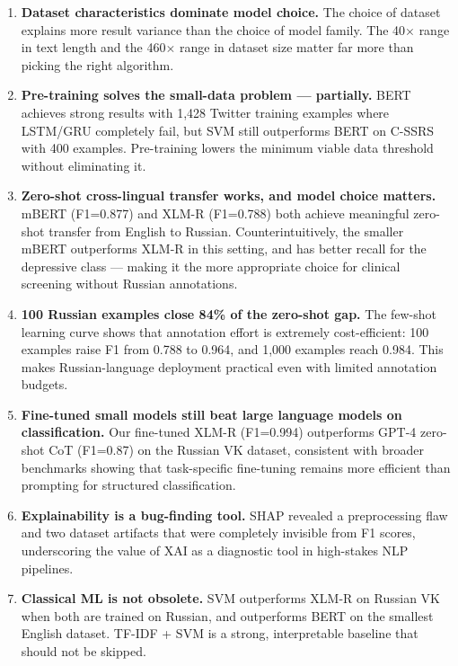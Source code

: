 \documentclass[12pt, a4paper, oneside]{report}
\begin{document}
\begin{enumerate}
    \item \textbf{Dataset characteristics dominate model choice.} The choice of dataset explains more result variance than the choice of model family. The 40$\times$ range in text length and the 460$\times$ range in dataset size matter far more than picking the right algorithm.

    \item \textbf{Pre-training solves the small-data problem — partially.} BERT achieves strong results with 1,428 Twitter training examples where LSTM/GRU completely fail, but SVM still outperforms BERT on C-SSRS with 400 examples. Pre-training lowers the minimum viable data threshold without eliminating it.

    \item \textbf{Zero-shot cross-lingual transfer works, and model choice matters.} mBERT (F1=0.877) and XLM-R (F1=0.788) both achieve meaningful zero-shot transfer from English to Russian. Counterintuitively, the smaller mBERT outperforms XLM-R in this setting, and has better recall for the depressive class — making it the more appropriate choice for clinical screening without Russian annotations.

    \item \textbf{100 Russian examples close 84\% of the zero-shot gap.} The few-shot learning curve shows that annotation effort is extremely cost-efficient: 100 examples raise F1 from 0.788 to 0.964, and 1,000 examples reach 0.984. This makes Russian-language deployment practical even with limited annotation budgets.

    \item \textbf{Fine-tuned small models still beat large language models on classification.} Our fine-tuned XLM-R (F1=0.994) outperforms GPT-4 zero-shot CoT (F1=0.87) on the Russian VK dataset, consistent with broader benchmarks showing that task-specific fine-tuning remains more efficient than prompting for structured classification.

    \item \textbf{Explainability is a bug-finding tool.} SHAP revealed a preprocessing flaw and two dataset artifacts that were completely invisible from F1 scores, underscoring the value of XAI as a diagnostic tool in high-stakes NLP pipelines.

    \item \textbf{Classical ML is not obsolete.} SVM outperforms XLM-R on Russian VK when both are trained on Russian, and outperforms BERT on the smallest English dataset. TF-IDF + SVM is a strong, interpretable baseline that should not be skipped.
\end{enumerate}
\end{document}
